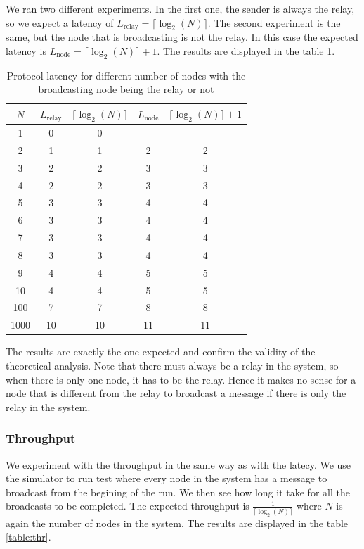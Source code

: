 \documentclass[a4paper]{article}
\begin{document}
We ran two different experiments. In the first one, the sender is always the
relay, so we expect a latency of $L_{\text{relay}} = \lceil\log_2(N)\rceil$.
The second experiment is the same, but the node that is broadcasting is not
the relay. In this case the expected latency is
$L_{\text{node}} = \lceil\log_2(N)\rceil + 1$. The results are displayed in
the table \ref{table:la}.

\begin{table}[H]
\centering
\begin{tabular}{|c|c|c|c|c|}
    \hline
    $N$  & $L_{\text{relay}}$ & $\lceil\log_2(N)\rceil$ & $L_{\text{node}}$ & $\lceil\log_2(N)\rceil + 1$ \\
    \hline
    1     & 0    & 0    & -    & -    \\
    2     & 1    & 1    & 2    & 2    \\
    3     & 2    & 2    & 3    & 3    \\
    4     & 2    & 2    & 3    & 3    \\
    5     & 3    & 3    & 4    & 4    \\
    6     & 3    & 3    & 4    & 4    \\
    7     & 3    & 3    & 4    & 4    \\
    8     & 3    & 3    & 4    & 4    \\
    9     & 4    & 4    & 5    & 5    \\
    10    & 4    & 4    & 5    & 5    \\
    100   & 7    & 7    & 8    & 8    \\
    1000  & 10   & 10   & 11   & 11   \\
    \hline
\end{tabular}
\caption{Protocol latency for different number of nodes with the broadcasting node being the relay or not}
\label{table:la}
\end{table}

The results are exactly the one expected and confirm the validity of the
theoretical analysis. Note that there must always be a relay in the system, so
when there is only one node, it has to be the relay. Hence it makes no sense
for a node that is different from the relay to broadcast a message if there is
only the relay in the system.

\subsubsection{Throughput}
We experiment with the throughput in the same way as with the latecy. We use
the simulator to run test where every node in the system has a message to
broadcast from the begining of the run. We then see how long it take for all
the broadcasts to be completed. The expected throughput is
$\frac{1}{\lceil\log_2(N)\rceil}$ where $N$ is again the number of nodes in
the system. The results are displayed in the table \ref{table:thr}.
\end{document}

